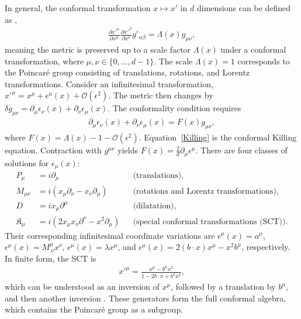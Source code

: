 \documentclass[foundations,article,submit,pdftex,moreauthors]{Definitions/mdpi}
\begin{document}
In general, the conformal transformation $x\longmapsto x'$ in $d$ dimensions can be defined as \cite{Francesco,Blumenhagen,Ji-Hari-2026-PRD},
\begin{align}
\frac{\partial x'^{\alpha}}{\partial x^{\mu}}\frac{\partial x'^{\beta}}{\partial x^{\nu}}g'_{\alpha\beta}=\Lambda(x)g_{\mu\nu},
\end{align}
meaning the metric is preserved up to a scale factor $\Lambda(x)$ under a conformal transformation, where $\mu,\nu\in\{0,\ldots,d-1\}$. The scale $\Lambda(x)=1$ corresponds to the Poincar\'e group consisting of translations, rotations, and Lorentz transformations. Consider an infinitesimal transformation, $x'^{\mu}=x^{\mu}+\epsilon^{\mu}(x)+\mathcal{O}(\epsilon^2)$. The metric then changes by $\delta g_{\mu\nu}=\partial_{\mu}\epsilon_{\nu}(x)+\partial_{\nu}\epsilon_{\mu}(x)$. The conformality condition requires
\begin{align}
\partial_{\mu}\epsilon_{\nu}(x)+\partial_{\nu}\epsilon_{\mu}(x)=F(x)g_{\mu\nu},\label{Killing}
\end{align}
where $F(x)=\Lambda(x)-1-\mathcal{O}(\epsilon^2)$. Equation~\eqref{Killing} is the conformal Killing equation. Contraction with $g^{\mu\nu}$ yields $F(x)=\frac{2}{d}\partial_{\mu}\epsilon^{\mu}$. There are four classes of solutions for $\epsilon_{\mu}(x)$:
\begin{align}
\label{conformal-generators}
P_{\mu}&=i\partial_{\mu} &&\text{(translations)},\nonumber\\
M_{\mu\nu}&=i\left(x_{\mu}\partial_{\nu}-x_{\nu}\partial_{\mu}\right) &&\text{(rotations and Lorentz transformations)},\nonumber\\
D&=ix_{\mu}\partial^{\mu} &&\text{(dilatation)},\nonumber\\
\mathfrak{K}_{\mu}&=i\left(2x_{\mu}x_{\nu}\partial^{\nu}-x^2\partial_{\mu}\right) &&\text{(special conformal transformations (SCT))}.
\end{align}
Their corresponding infinitesimal coordinate variations are $\epsilon^{\mu}(x)=a^{\mu}$, $\epsilon^{\mu}(x)=M^{\mu}_{~\nu}x^{\nu}$, $\epsilon^{\mu}(x)=\lambda x^{\mu}$, and $\epsilon^{\mu}(x)=2(b\cdot x)x^{\mu}-x^2b^{\mu}$, respectively. In finite form, the SCT is
\begin{align}
x'^{\mu}=\frac{x^{\mu}-b^{\mu}x^{2}}{1-2b\cdot x+b^{2}x^{2}},
\end{align}
which can be understood as an inversion of $x^\mu$, followed by a translation by $b^\mu$, and then another inversion \cite{Blumenhagen,Ji-Hari-2026-PRD}. These generators form the full conformal algebra, which contains the Poincar\'e group as a subgroup.
\end{document}
